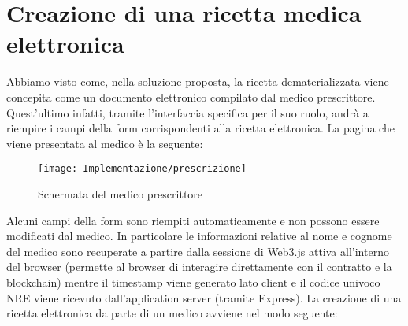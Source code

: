 \section{Creazione di una ricetta medica elettronica}
%
Abbiamo visto come, nella soluzione proposta, la ricetta dematerializzata viene concepita come un documento elettronico compilato dal medico prescrittore. Quest'ultimo infatti, tramite l'interfaccia specifica per il suo ruolo, andrà a riempire i campi della form corrispondenti alla ricetta elettronica. La pagina che viene presentata al medico è la seguente:
%
\begin{figure}[H]
	\centering
	\texttt{[image: Implementazione/prescrizione]}
	\caption{Schermata del medico prescrittore}
	\label{fig:schermata del medico prescrittore}
\end{figure}
%
Alcuni campi della form sono riempiti automaticamente e non possono essere modificati dal medico. In particolare le informazioni relative al nome e cognome del medico sono recuperate a partire dalla sessione di Web3.js attiva all'interno del browser (permette al browser di interagire direttamente con il contratto e la blockchain) mentre il timestamp viene generato lato client e il codice univoco NRE viene ricevuto dall'application server (tramite Express). La creazione di una ricetta elettronica da parte di un medico avviene nel modo seguente:
